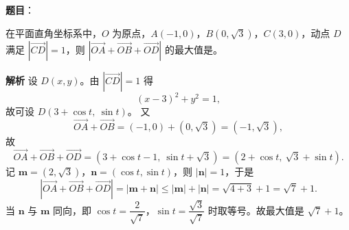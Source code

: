 \begin{answer}

\textbf{题目}：

在平面直角坐标系中，$O$ 为原点，$A(-1,0)$，$B(0,\sqrt3)$，$C(3,0)$，动点 $D$ 满足 $|\overrightarrow{CD}|=1$，则 $|\overrightarrow{OA}+\overrightarrow{OB}+\overrightarrow{OD}|$ 的最大值是\gkblank{}。

\textbf{解析}
设 $D(x,y)$。由 $|\overrightarrow{CD}|=1$ 得
\nopagebreak[4]
\[(x-3)^2+y^2=1,\]
故可设 $D(3+\cos t,\ \sin t)$。
又
\nopagebreak[4]
\[\overrightarrow{OA}+\overrightarrow{OB}=(-1,0)+(0,\sqrt3)=(-1,\sqrt3),\]
故
\nopagebreak[4]
\[\overrightarrow{OA}+\overrightarrow{OB}+\overrightarrow{OD}=(3+\cos t-1,\ \sin t+\sqrt3)=(2+\cos t,\ \sqrt3+\sin t).\]
记 $\boldsymbol m=(2,\sqrt3)$，$\boldsymbol n=(\cos t,\sin t)$，则 $|\boldsymbol n|=1$，于是
\nopagebreak[4]
\[\left|\overrightarrow{OA}+\overrightarrow{OB}+\overrightarrow{OD}\right|=|\boldsymbol m+\boldsymbol n|\leqslant|\boldsymbol m|+|\boldsymbol n|=\sqrt{4+3}+1=\sqrt7+1 .\]
当 $\boldsymbol n$ 与 $\boldsymbol m$ 同向，即 $\cos t=\dfrac2{\sqrt7}$，$\sin t=\dfrac{\sqrt3}{\sqrt7}$ 时取等号。故最大值是 $\sqrt7+1$。


\end{answer}
